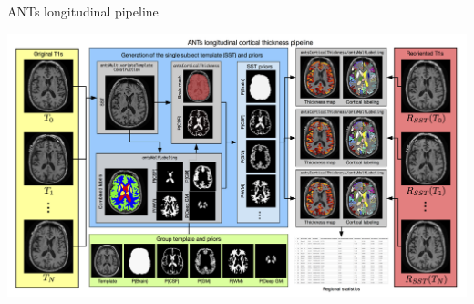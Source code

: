 \documentclass[ignorenonframetext,]{beamer}
\begin{document}
\begin{frame}{ANTs longitudinal pipeline}

\centering
\includegraphics[width=0.99 \textwidth]{../../Figures/longitudinalPipeline.png}

\end{frame}
\end{document}
